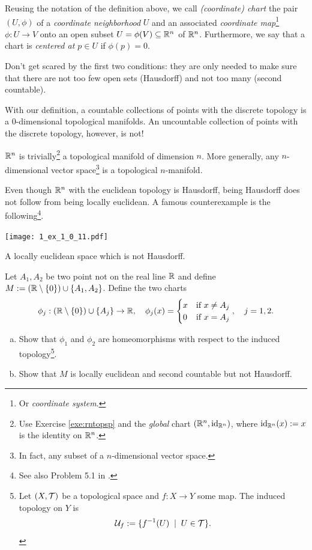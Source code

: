 \begin{ntn}
  Reusing the notation of the definition above, we call \emph{(coordinate) chart} the pair $(U, \phi)$ of a \emph{coordinate neighborhood} $U$ and an associated \emph{coordinate map}\footnote{Or \emph{coordinate system}.} $\phi: U\to V$ onto an open subset $U=\phi(V)\subseteq\mathbb{R}^n$ of $\mathbb{R}^n$.
  Furthermore, we say that a chart is \emph{centered at $p\in U$} if $\phi(p) = 0$.
\end{ntn}

Don't get scared by the first two conditions: they are only needed to make sure that there are not too few open sets (Hausdorff) and not too many (second countable).

\begin{ex}
  With our definition, a countable collections of points with the discrete topology is a $0$-dimensional topological manifolds.
  An uncountable collection of points with the discrete topology, however, is not!
\end{ex}

\begin{ex}
  $\mathbb{R}^n$ is trivially\footnote{Use Exercise \ref{exe:rntopsp} and the \emph{global} chart $(\mathbb{R}^n, \operatorname{id}_{\mathbb{R}^n})$, where $\operatorname{id}_{\mathbb{R}^n}(x) := x$ is the identity on $\mathbb{R}^n$.} a topological manifold of dimension $n$.
  More generally, any $n$-dimensional vector space\footnote{In fact, any subset of a $n$-dimensional vector space.} is a topological $n$-manifold.
\end{ex}

\begin{exe}
	Even though $\mathbb{R}^n$ with the euclidean topology is Hausdorff, being Hausdorff does not follow from being locally euclidean. A famous counterexample is the following\footnote{See also Problem 5.1 in \cite{book:tu}.}.
  \begin{marginfigure}
    \texttt{[image: 1\_ex\_1\_0\_11.pdf]}
    \label{fig:hausdorff-not-locally-euclidean}
    \caption{A locally euclidean space which is not Hausdorff.}
  \end{marginfigure}
  Let $A_1, A_2$ be two point not on the real line $\mathbb{R}$ and define $M:= (\mathbb{R}\setminus\{0\})\cup\{A_1,A_2\}$.
  Define the two charts
  \begin{equation}
  \phi_j:(\mathbb{R}\setminus\{0\})\cup\{A_j\} \to \mathbb{R}, \quad
  \phi_j(x) = \begin{cases} x &\mbox{if } x\neq A_j\\ 0 & \mbox{if } x = A_j \end{cases}, \quad
  j = 1,2.
  \end{equation}
  \begin{enumerate}[(a)]
    \item Show that $\phi_1$ and $\phi_2$ are homeomorphisms with respect to the induced topology\footnote{Let $(X, \mathcal{T})$ be a topological space and $f: X\to Y$ some map. The induced topology on $Y$ is \begin{equation}\mathcal{U}_f := \{f^{-1}(U) \;\mid\; U\in\mathcal{T}\}.\end{equation}}.
    \item Show that $M$ is locally euclidean and second countable but not Hausdorff.
  \end{enumerate}
\end{exe}

